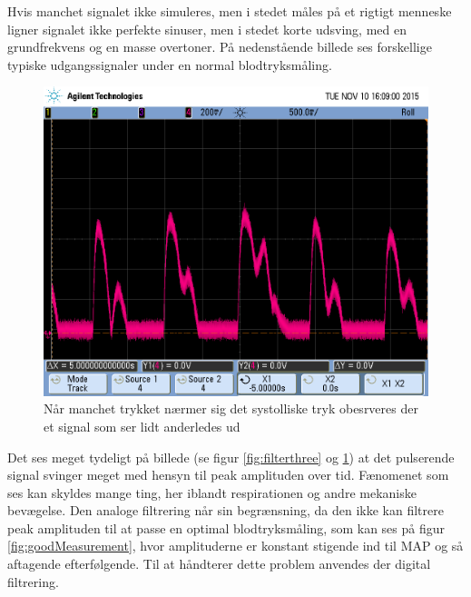 Hvis manchet signalet ikke simuleres, men i stedet måles på et rigtigt menneske ligner signalet ikke perfekte sinuser, men i stedet korte udsving, med en grundfrekvens og en masse overtoner. På nedenstående billede ses forskellige typiske udgangssignaler under en normal blodtryksmåling.
\newpage

\begin{figure}[H]
	\includegraphics[width=\textwidth]{Implementeringsdokument/billeder/scope_2.png}
	\caption{Når manchet trykket nærmer sig det systolliske tryk obesrveres der et signal som ser lidt anderledes ud}\label{fig:filterfour}
\end{figure}

Det ses meget tydeligt på billede (se figur \ref{fig:filterthree} og \ref{fig:filterfour}) at det pulserende signal svinger meget med hensyn til peak amplituden over tid. Fænomenet som ses kan skyldes mange ting, her iblandt respirationen og andre mekaniske bevægelse. Den analoge filtrering når sin begrænsning, da den ikke kan filtrere peak amplituden til at passe en optimal blodtryksmåling, som kan ses på figur \ref{fig:goodMeasurement}, hvor amplituderne er konstant stigende ind til MAP og så aftagende efterfølgende. Til at håndterer dette problem anvendes der digital filtrering.
\newpage

